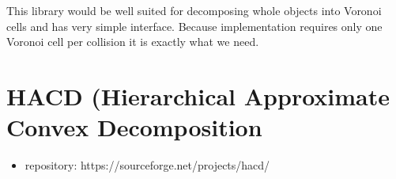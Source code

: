 This library would be well suited for decomposing whole objects into Voronoi cells and has very simple interface. Because implementation requires only one Voronoi cell per collision it is exactly what we need.

\section{HACD (Hierarchical Approximate Convex Decomposition}
\begin{itemize}
\item repository: https://sourceforge.net/projects/hacd/
\end{itemize}
\cite{HACD}






